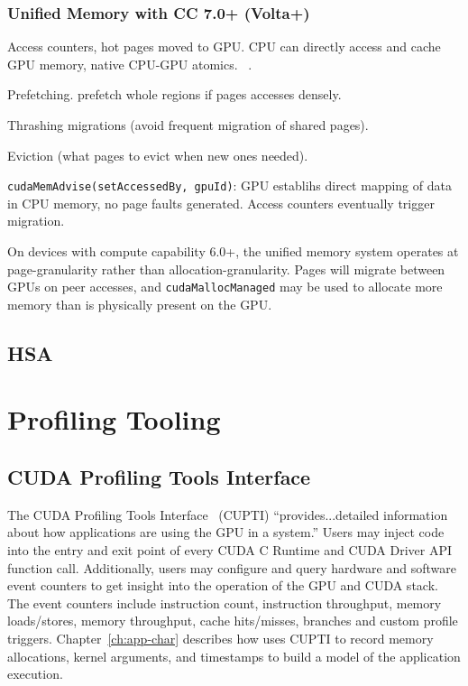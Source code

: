 \subsubsection {Unified Memory with CC 7.0+ (Volta+) }

Access counters, hot pages moved to GPU.
CPU can directly access and cache GPU memory, native CPU-GPU atomics.
~\cite{sakharnykh2017unified}.

Prefetching.
prefetch whole regions if pages accesses densely.

Thrashing migrations (avoid frequent migration of shared pages).

Eviction (what pages to evict when new ones needed).

\texttt{cudaMemAdvise(setAccessedBy, gpuId)}: GPU establihs direct mapping of data in CPU memory, no page faults generated.
Access counters eventually trigger migration.





On devices with compute capability 6.0+, the unified memory system operates at page-granularity rather than allocation-granularity.
Pages will migrate between GPUs on peer accesses, and \texttt{cudaMallocManaged} may be used to allocate more memory than is physically present on the GPU.


\subsection{HSA}
\label{sec:hsa}


\section{Profiling Tooling}

\subsection{CUDA Profiling Tools Interface}
\label{sec:cupti}

The CUDA Profiling Tools Interface~\cite{nvidia2017cupti} (CUPTI) ``provides...detailed information about how applications are using the GPU in a system.''
Users may inject code into the entry and exit point of every CUDA C Runtime and CUDA Driver API function call.
Additionally, users may configure and query hardware and software event counters to get insight into the operation of the GPU and CUDA stack.
The event counters include instruction count, instruction throughput, memory loads/stores, memory throughput, cache hits/misses, branches and custom profile triggers.
Chapter~\ref{ch:app-char} describes how  uses CUPTI to record memory allocations, kernel arguments, and timestamps to build a model of the application execution.


